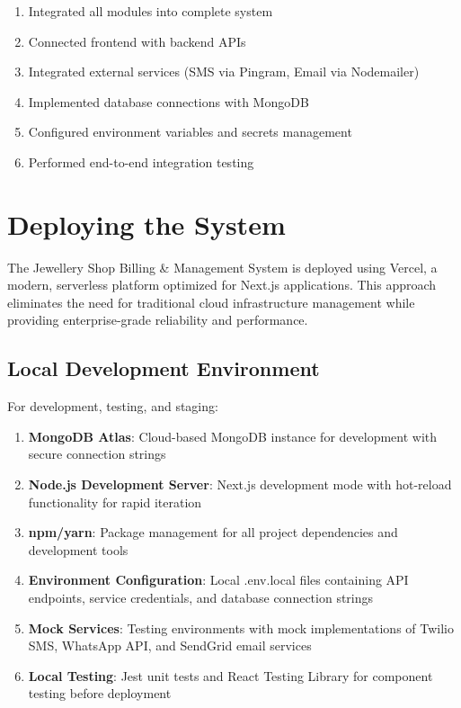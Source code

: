 \documentclass[12pt,a4paper]{report}
\begin{document}
\begin{enumerate}[label=\roman*)]
    \item Integrated all modules into complete system
    \item Connected frontend with backend APIs
    \item Integrated external services (SMS via Pingram, Email via Nodemailer)
    \item Implemented database connections with MongoDB
    \item Configured environment variables and secrets management
    \item Performed end-to-end integration testing
\end{enumerate}

\section{Deploying the System}

The Jewellery Shop Billing \& Management System is deployed using Vercel, a modern, serverless platform optimized for Next.js applications. This approach eliminates the need for traditional cloud infrastructure management while providing enterprise-grade reliability and performance.

\subsection{Local Development Environment}

For development, testing, and staging:

\begin{enumerate}[label=\roman*)]
    \item \textbf{MongoDB Atlas}: Cloud-based MongoDB instance for development with secure connection strings
    \item \textbf{Node.js Development Server}: Next.js development mode with hot-reload functionality for rapid iteration
    \item \textbf{npm/yarn}: Package management for all project dependencies and development tools
    \item \textbf{Environment Configuration}: Local .env.local files containing API endpoints, service credentials, and database connection strings
    \item \textbf{Mock Services}: Testing environments with mock implementations of Twilio SMS, WhatsApp API, and SendGrid email services
    \item \textbf{Local Testing}: Jest unit tests and React Testing Library for component testing before deployment
\end{enumerate}
\end{document}
